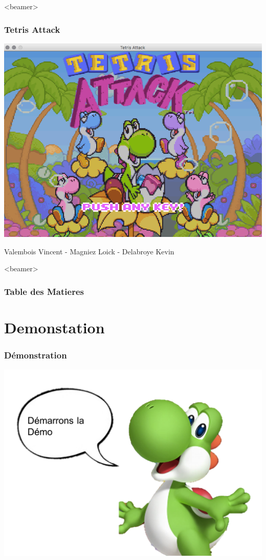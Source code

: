 \documentclass{beamer}
\begin{document}
  
 \begin{darkframes}
    \begin{frame}<beamer>
     \frametitle[alignment=center]{Tetris Attack}
      \begin{center}
		\includegraphics[scale=0.45]{./Image/img1.png}
		
		\end{center}
		\vspace*{0.1cm}
		  \begin{center}
		Valembois Vincent - Magniez Loick - Delabroye Kevin
		\end{center}
    \end{frame}

    \begin{frame}<beamer>
      \frametitle{Table des Matieres}
      \tableofcontents[]
    \end{frame}
    

 \section{Demonstation}
 \begin{frame}
 	 \frametitle{Démonstration}
 	 \includegraphics[scale=0.3]{./Image/demo.png}
    \end{frame}
    

\end{darkframes}
\end{document}
